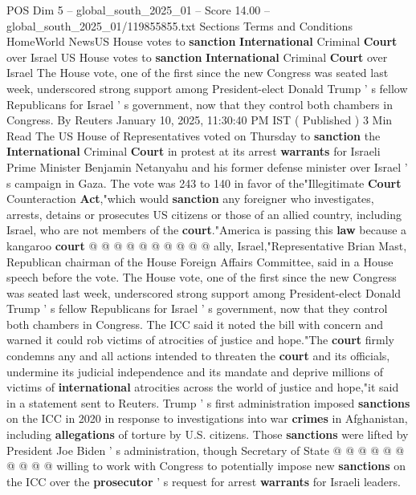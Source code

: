 \begin{textsample}{POS Dim 5 – global\_south\_2025\_01 – Score 14.00 – global\_south\_2025\_01/119855855.txt}  \label{ex:f5_pos_353}
Sections Terms and Conditions HomeWorld NewsUS House votes to \textbf{sanction} \textbf{International} Criminal \textbf{Court} over Israel US House votes to \textbf{sanction} \textbf{International} Criminal \textbf{Court} over Israel The House vote, one of the first since the new Congress was seated last week, underscored strong support among President-elect Donald Trump ' s fellow Republicans for Israel ' s government, now that they control both chambers in Congress.
By Reuters January 10, 2025, 11:30:40 PM IST ( Published ) 3 Min Read The US House of Representatives voted on Thursday to \textbf{sanction} the \textbf{International} Criminal \textbf{Court} in protest at its arrest \textbf{warrants} for Israeli Prime Minister Benjamin Netanyahu and his former defense minister over Israel ' s campaign in Gaza.
The vote was 243 to 140 in favor of the"Illegitimate \textbf{Court} Counteraction \textbf{Act},"which would \textbf{sanction} any foreigner who investigates, arrests, detains or prosecutes US citizens or those of an allied country, including Israel, who are not members of the \textbf{court}."America is passing this \textbf{law} because a kangaroo \textbf{court} @ @ @ @ @ @ @ @ @ @ ally, Israel,"Representative Brian Mast, Republican chairman of the House Foreign Affairs Committee, said in a House speech before the vote.
The House vote, one of the first since the new Congress was seated last week, underscored strong support among President-elect Donald Trump ' s fellow Republicans for Israel ' s government, now that they control both chambers in Congress.
The ICC said it noted the bill with concern and warned it could rob victims of atrocities of justice and hope."The \textbf{court} firmly condemns any and all actions intended to threaten the \textbf{court} and its officials, undermine its judicial independence and its mandate and deprive millions of victims of \textbf{international} atrocities across the world of justice and hope,"it said in a statement sent to Reuters.
Trump ' s first administration imposed \textbf{sanctions} on the ICC in 2020 in response to investigations into war \textbf{crimes} in Afghanistan, including \textbf{allegations} of torture by U.S. citizens.
Those \textbf{sanctions} were lifted by President Joe Biden ' s administration, though Secretary of State @ @ @ @ @ @ @ @ @ @ willing to work with Congress to potentially impose new \textbf{sanctions} on the ICC over the \textbf{prosecutor} ' s request for arrest \textbf{warrants} for Israeli leaders.

\end{textsample}
